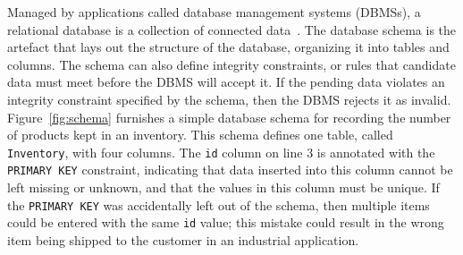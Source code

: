 



Managed by applications called database management systems (DBMSs), a relational database is a collection of connected
data~\cite{databasebook}. The database schema is the artefact that lays out the structure of the database, organizing it
into tables and columns.  The schema can also define integrity constraints, or rules that candidate data must meet
before the DBMS will accept it. If the pending data violates an integrity constraint specified by the schema, then the
DBMS rejects it as invalid.  Figure~\ref{fig:schema} furnishes a simple database schema for recording the number of
products kept in an inventory. This schema defines one table, called \texttt{Inventory}, with four columns.  The
\texttt{id} column on line $3$ is annotated with the \texttt{PRIMARY KEY} constraint, indicating that data inserted
into this column cannot be left missing or unknown, and that the values in this column must be unique. If the
\texttt{PRIMARY KEY} was accidentally left out of the schema, then multiple items could be entered with the same
\texttt{id} value; this mistake could result in the wrong item being shipped to the customer in an industrial
application.
